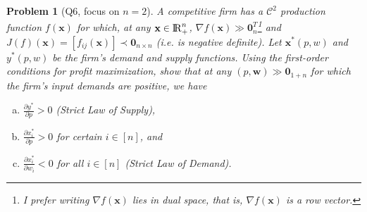 \documentclass{article}
\newtheorem*{prob}{{\bf Problem}}
\newcommand {\Reals}  {{\rm I \! R}}
\newcommand{\1}{{\bf 1}}
\newcommand{\cC}{\mathcal{C}}
\newcommand{\0}{{\mathbf{0}}}
\newcommand{\w}{{\mathbf{w}}}
\newcommand{\x}{{\mathbf{x}}}
\newcommand{\<}{\langle}
\renewcommand{\>}{\rangle}
\begin{document}
\begin{prob}[Q6, focus on $n=2$]A competitive firm has a $\cC^2$ production function $f(\x)$ for which, at any $ \x \in \Reals^n_+$, $\nabla f(\x) \gg \0_{n}^T$\footnote{I prefer writing $\nabla f(\x)$ lies in dual space, that is, $\nabla f(\x)$ is a row vector.} and $J(f)(\x) = [f_{ij}(\x)] \prec \0_{n \times n}$ (i.e. is negative definite). Let $\x^*(p,w)$ and $y^*	(p,w)$ be
	the firm's demand and supply functions. Using the first-order conditions for profit maximization, show that at any $(p,\w) \gg \0_{1+n}$ for which the firm's input demands are positive, we have
\begin{enumerate}[(a)]
	\item 	$\frac{\partial y^* }{\partial p} > 0$ (Strict Law of Supply),
\item $\frac{\partial x_i^*}{\partial p} > 0$ for certain $i \in [n]$, and
\item  $\frac{\partial x_i^*}{\partial w_i} < 0$ for all $i \in [n]$ (Strict Law of Demand).
\end{enumerate}
\end{prob}
\end{document}
